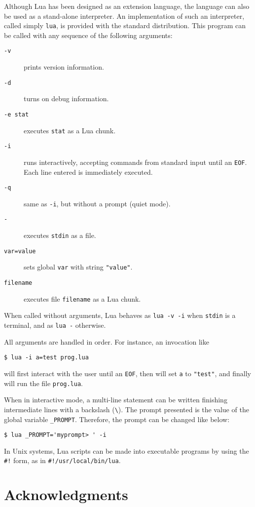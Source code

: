 \documentclass[11pt]{article}
\newcommand{\T}[1]{{\tt #1}}
\begin{document}
Although Lua has been designed as an extension language,
the language can also be used as a stand-alone interpreter.
An implementation of such an interpreter,
called simply \verb|lua|,
is provided with the standard distribution.
This program can be called with any sequence of the following arguments:
\begin{description}
\item[\T{-v}] prints version information.
\item[\T{-d}] turns on debug information.
\item[\T{-e stat}] executes \verb|stat| as a Lua chunk.
\item[\T{-i}] runs interactively,
accepting commands from standard input until an \verb|EOF|.
Each line entered is immediately executed.
\item[\T{-q}] same as \T{-i}, but without a prompt (quiet mode).
\item[\T{-}] executes \verb|stdin| as a file.
\item[\T{var=value}] sets global \verb|var| with string \verb|"value"|.
\item[\T{filename}] executes file \verb|filename| as a Lua chunk.
\end{description}
When called without arguments,
Lua behaves as \verb|lua -v -i| when \verb|stdin| is a terminal,
and as \verb|lua -| otherwise.

All arguments are handled in order.
For instance, an invocation like
\begin{verbatim}
$ lua -i a=test prog.lua
\end{verbatim}
will first interact with the user until an \verb|EOF|,
then will set \verb|a| to \verb|"test"|,
and finally will run the file \verb|prog.lua|.

When in interactive mode,
a multi-line statement can be written finishing intermediate
lines with a backslash (\verb|\|).
The prompt presented is the value of the global variable \verb|_PROMPT|.
Therefore, the prompt can be changed like below:
\begin{verbatim}
$ lua _PROMPT='myprompt> ' -i
\end{verbatim}

In Unix systems, Lua scripts can be made into executable programs
by using the \verb|#!| form,
as in \verb|#!/usr/local/bin/lua|.

\section*{Acknowledgments}
\end{document}
